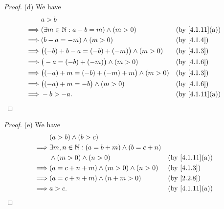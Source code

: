 \begin{proof}{(d)}
  We have
  \begin{align*}
             & a > b                                                                                \\
    \implies & (\exists m \in \N : a - b = m) \land (m > 0)       &  & \text{(by \cref{4.1.11}(a))} \\
    \implies & (b - a = -m) \land (m > 0)                         &  & \by{4.1.4}                   \\
    \implies & \big((-b) + b - a = (-b) + (-m)\big) \land (m > 0) &  & \by{4.1.3}                   \\
    \implies & \big(-a = (-b) + (-m)\big) \land (m > 0)           &  & \by{4.1.6}                   \\
    \implies & \big((-a) + m = (-b) + (-m) + m\big) \land (m > 0) &  & \by{4.1.3}                   \\
    \implies & \big((-a) + m = -b\big) \land (m > 0)              &  & \by{4.1.6}                   \\
    \implies & -b > -a.                                           &  & \text{(by \cref{4.1.11}(a))}
  \end{align*}
\end{proof}

\begin{proof}{(e)}
  We have
  \begin{align*}
             & (a > b) \land (b > c)                                                                 \\
    \implies & \exists m, n \in \N : (a = b + m) \land (b = c + n)                                   \\
             & \land (m > 0) \land (n > 0)                         &  & \text{(by \cref{4.1.11}(a))} \\
    \implies & (a = c + n + m) \land (m > 0) \land (n > 0)         &  & \by{4.1.3}                   \\
    \implies & (a = c + n + m) \land (n + m > 0)                   &  & \by{2.2.8}                   \\
    \implies & a > c.                                              &  & \text{(by \cref{4.1.11}(a))}
  \end{align*}
\end{proof}

